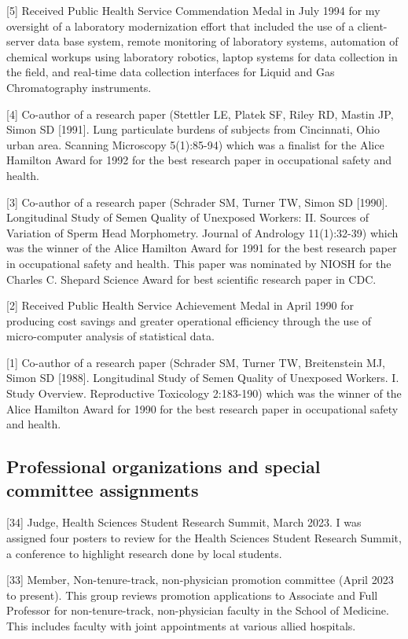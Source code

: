 \documentclass[
  12pt,
]{article}
\begin{document}
{[}5{]} Received Public Health Service Commendation Medal in July 1994
for my oversight of a laboratory modernization effort that included the
use of a client-server data base system, remote monitoring of laboratory
systems, automation of chemical workups using laboratory robotics,
laptop systems for data collection in the field, and real-time data
collection interfaces for Liquid and Gas Chromatography instruments.

{[}4{]} Co-author of a research paper (Stettler LE, Platek SF, Riley RD,
Mastin JP, Simon SD {[}1991{]}. Lung particulate burdens of subjects
from Cincinnati, Ohio urban area. Scanning Microscopy 5(1):85-94) which
was a finalist for the Alice Hamilton Award for 1992 for the best
research paper in occupational safety and health.

{[}3{]} Co-author of a research paper (Schrader SM, Turner TW, Simon SD
{[}1990{]}. Longitudinal Study of Semen Quality of Unexposed Workers:
II. Sources of Variation of Sperm Head Morphometry. Journal of Andrology
11(1):32-39) which was the winner of the Alice Hamilton Award for 1991
for the best research paper in occupational safety and health. This
paper was nominated by NIOSH for the Charles C. Shepard Science Award
for best scientific research paper in CDC.

{[}2{]} Received Public Health Service Achievement Medal in April 1990
for producing cost savings and greater operational efficiency through
the use of micro-computer analysis of statistical data.

{[}1{]} Co-author of a research paper (Schrader SM, Turner TW,
Breitenstein MJ, Simon SD {[}1988{]}. Longitudinal Study of Semen
Quality of Unexposed Workers. I. Study Overview. Reproductive Toxicology
2:183-190) which was the winner of the Alice Hamilton Award for 1990 for
the best research paper in occupational safety and health.

\subsection{Professional organizations and special committee
assignments}\label{professional-organizations-and-special-committee-assignments}

{[}34{]} Judge, Health Sciences Student Research Summit, March 2023. I
was assigned four posters to review for the Health Sciences Student
Research Summit, a conference to highlight research done by local
students.

{[}33{]} Member, Non-tenure-track, non-physician promotion committee
(April 2023 to present). This group reviews promotion applications to
Associate and Full Professor for non-tenure-track, non-physician faculty
in the School of Medicine. This includes faculty with joint appointments
at various allied hospitals.
\end{document}
